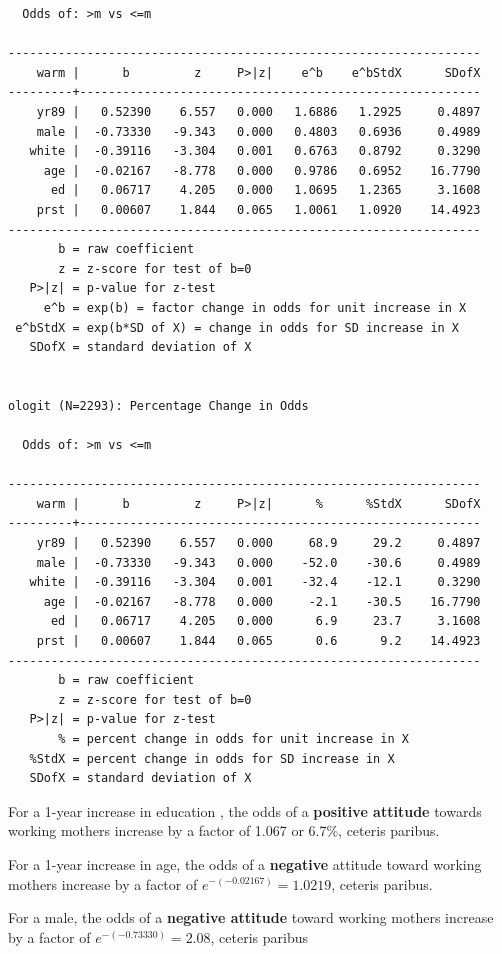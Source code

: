 \documentclass[
]{book}
\begin{document}
\begin{verbatim}
  Odds of: >m vs <=m

------------------------------------------------------------------
    warm |      b         z     P>|z|    e^b    e^bStdX      SDofX
---------+--------------------------------------------------------
    yr89 |   0.52390    6.557   0.000   1.6886   1.2925     0.4897
    male |  -0.73330   -9.343   0.000   0.4803   0.6936     0.4989
   white |  -0.39116   -3.304   0.001   0.6763   0.8792     0.3290
     age |  -0.02167   -8.778   0.000   0.9786   0.6952    16.7790
      ed |   0.06717    4.205   0.000   1.0695   1.2365     3.1608
    prst |   0.00607    1.844   0.065   1.0061   1.0920    14.4923
------------------------------------------------------------------
       b = raw coefficient
       z = z-score for test of b=0
   P>|z| = p-value for z-test
     e^b = exp(b) = factor change in odds for unit increase in X
 e^bStdX = exp(b*SD of X) = change in odds for SD increase in X
   SDofX = standard deviation of X


ologit (N=2293): Percentage Change in Odds 

  Odds of: >m vs <=m

------------------------------------------------------------------
    warm |      b         z     P>|z|      %      %StdX      SDofX
---------+--------------------------------------------------------
    yr89 |   0.52390    6.557   0.000     68.9     29.2     0.4897
    male |  -0.73330   -9.343   0.000    -52.0    -30.6     0.4989
   white |  -0.39116   -3.304   0.001    -32.4    -12.1     0.3290
     age |  -0.02167   -8.778   0.000     -2.1    -30.5    16.7790
      ed |   0.06717    4.205   0.000      6.9     23.7     3.1608
    prst |   0.00607    1.844   0.065      0.6      9.2    14.4923
------------------------------------------------------------------
       b = raw coefficient
       z = z-score for test of b=0
   P>|z| = p-value for z-test
       % = percent change in odds for unit increase in X
   %StdX = percent change in odds for SD increase in X
   SDofX = standard deviation of X
\end{verbatim}

For a 1-year increase in education , the odds of a \textbf{positive attitude} towards working mothers increase by a factor of 1.067 or 6.7\%, ceteris paribus.

For a 1-year increase in age, the odds of a \textbf{negative} attitude toward working mothers increase by a factor of \(e^{-(-0.02167)}=1.0219\), ceteris paribus.

For a male, the odds of a \textbf{negative attitude} toward working mothers increase by a factor of \(e^{-(-0.73330)}=2.08\), ceteris paribus
\end{document}
